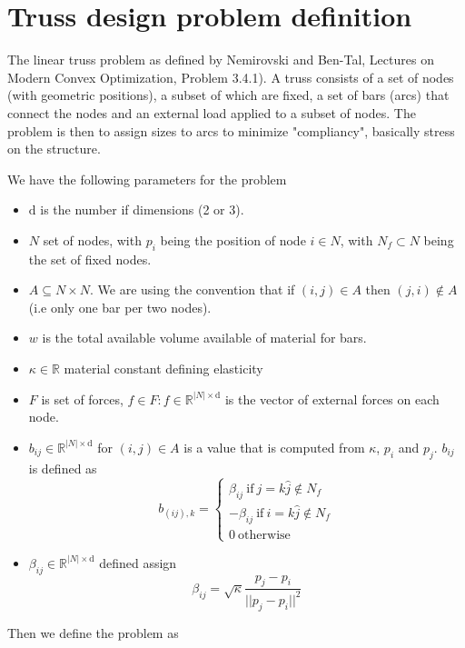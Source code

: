 \documentclass{article}
\begin{document}
\section{Truss design problem definition}

The linear truss problem as defined by Nemirovski and Ben-Tal,
Lectures on Modern Convex Optimization, Problem 3.4.1). A truss consists of a
set of nodes (with geometric positions), a subset of which are fixed, a set of
bars (arcs) that connect
the nodes and an external load applied to a subset of nodes. The problem is
then to assign sizes to arcs to minimize "compliancy", basically stress on the
structure.

We have the following parameters for the problem
\begin{itemize}
\item $\mathrm{d}$ is the number if dimensions (2 or 3).
\item $N$ set of nodes, with $p_i$ being the position of node $i\in N$, with $N_f\subset N$ being the set of fixed nodes.
\item $A\subseteq N\times N$. We are using the convention that if $(i,j)\in A$
    then $(j,i)\not\in A$ (i.e only one bar per two nodes). 
\item $w$ is the total available volume available of material for bars.
\item $\kappa\in\mathbb{R}$ material constant defining elasticity
\item $F$ is set of forces, $f\in F: f\in\mathbb{R}^{|N|\times\mathrm{d}}$ is the vector of external forces on each node.
\item $b_{ij}\in\mathbb{R}^{|N|\times\mathrm{d}}$ for $(i,j)\in A$ is a value that is computed from $\kappa$, $p_i$ and $p_j$. $b_{ij}$ is defined as 
    \[
        b_{(ij),k} = \left\{ 
            \begin{array}{l}
                \beta_{ij}\ \mathrm{ if }\ j = k\hat j\not\in N_f \\
                -\beta_{ij}\ \mathrm{ if }\ i = k\hat j\not\in N_f \\
                0\  \mathrm{ otherwise}
            \end{array}
        \right.
    \]
\item $\beta_{ij}\in\mathbb{R}^{|N|\times\mathrm{d}}$ defined assign
    \[
        \beta_{ij} = \sqrt\kappa \frac{p_j-p_i}{||p_j-p_i||^2}
    \]
\end{itemize}

Then we define the problem as 
\end{document}
